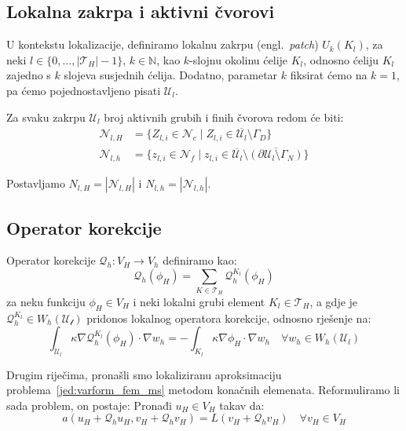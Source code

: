 \documentclass[zavrsnirad]{fer}
\begin{document}
\subsection{Lokalna zakrpa i aktivni čvorovi}

U kontekstu lokalizacije, definiramo lokalnu zakrpu (engl.\ \textit{patch}) $U_k(K_l)$,
za neki $l \in \{0, \ldots, |\mathcal{T}_H| - 1\}$, $k \in \mathbb{N}$, kao $k$-slojnu okolinu ćelije $K_l$,
odnosno ćeliju $K_l$ zajedno s $k$ slojeva susjednih ćelija. Dodatno, parametar $k$
fiksirat ćemo na $k = 1$, pa ćemo pojednostavljeno pisati $\mathcal{U}_l$.

Za svaku zakrpu $\mathcal{U}_l$ broj aktivnih grubih i finih čvorova redom će biti:
\begin{align}
  \label{jed:active_nodes}
  \mathcal{N}_{l,H} &= \{Z_{l,i} \in \mathcal{N}_c \mid Z_{l,i} \in \overline{\mathcal{U}_l} \setminus \Gamma_D\} \\
  \mathcal{N}_{l,h} &= \{z_{l,i} \in \mathcal{N}_f \mid z_{l,i} \in \overline{\mathcal{U}_l} \setminus \overline{(\partial\mathcal{U}_l \setminus \Gamma_N)}\}
\end{align}

Postavljamo $N_{l,H} = |\mathcal{N}_{l,H}|$ i $N_{l,h} = |\mathcal{N}_{l,h}|$.


\subsection{Operator korekcije}

Operator korekcije $\mathcal{Q}_h : V_H \to V_h$ definiramo kao:
\begin{equation}
  \label{jed:operator_korekcije}
  \mathcal{Q}_h(\phi_H) = \sum_{K \in \mathcal{T}_H} \mathcal{Q}_h^{K_l}(\phi_H)
\end{equation}
za neku funkciju $\phi_H \in V_H$ i neki lokalni grubi element $K_l \in \mathcal{T}_H$,
a gdje je $\mathcal{Q}_h^{K_l} \in W_h(\mathcal{U_l})$ pridonos lokalnog operatora korekcije, odnosno rješenje na:
\begin{equation}
  \label{jed:operator_korekcije_lokalno}
  \int_{\mathcal{U}_l} \kappa \nabla \mathcal{Q}_h^{K_l}(\phi_H) \cdot \nabla w_h = - \int_{K_l} \kappa \nabla \phi_H \cdot \nabla w_h \quad \forall w_h \in W_h(\mathcal{U}_l)
\end{equation}

Drugim riječima, pronašli smo lokaliziranu aproksimaciju problema\ \ref{jed:varform_fem_ms} metodom konačnih elemenata.
Reformuliramo li sada problem, on postaje: Pronađi $u_H \in V_H$ takav da:
\begin{equation}
  \label{jed:varform_fem_ms_korekcija}
  a(u_H + \mathcal{Q}_h u_H, v_H + \mathcal{Q}_h v_H) = L(v_H + \mathcal{Q}_h v_H) \quad \forall v_H \in V_H
\end{equation}
\end{document}
